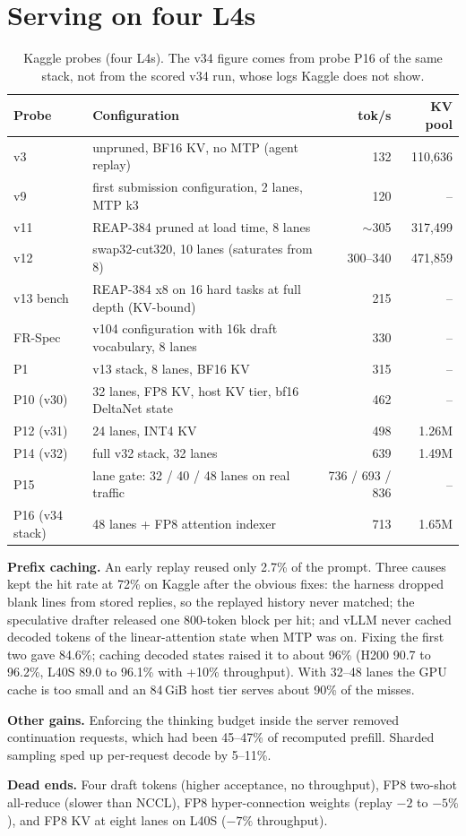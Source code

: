 \section{Serving on four L4s}\label{app:serving}

\begin{table}[H]\centering\small
\begin{tabularx}{\linewidth}{@{}lXrr@{}}
\toprule
Probe & Configuration & tok/s & KV pool \\
\midrule
v3 & unpruned, BF16 KV, no MTP (agent replay) & 132 & 110,636 \\
v9 & first submission configuration, 2 lanes, MTP k3 & 120 & -- \\
v11 & REAP-384 pruned at load time, 8 lanes & $\sim$305 & 317,499 \\
v12 & swap32-cut320, 10 lanes (saturates from 8) & 300--340 & 471,859 \\
v13 bench & REAP-384 x8 on 16 hard tasks at full depth (KV-bound) & 215 & -- \\
FR-Spec & v104 configuration with 16k draft vocabulary, 8 lanes & 330 & -- \\
P1 & v13 stack, 8 lanes, BF16 KV & 315 & -- \\
P10 (v30) & 32 lanes, FP8 KV, host KV tier, bf16 DeltaNet state & 462 & -- \\
P12 (v31) & 24 lanes, INT4 KV & 498 & 1.26M \\
P14 (v32) & full v32 stack, 32 lanes & 639 & 1.49M \\
P15 & lane gate: 32 / 40 / 48 lanes on real traffic & 736 / 693 / 836 & -- \\
P16 (v34 stack) & 48 lanes + FP8 attention indexer & 713 & 1.65M \\
\bottomrule
\end{tabularx}
\caption{Kaggle probes (four L4s). The v34 figure comes from probe P16 of the same stack, not from the scored v34 run, whose logs Kaggle does not show.}
\end{table}

\textbf{Prefix caching.} An early replay reused only 2.7\% of the prompt. Three causes kept the hit rate at 72\% on Kaggle after the obvious fixes: the harness dropped blank lines from stored replies, so the replayed history never matched; the speculative drafter released one 800-token block per hit; and vLLM never cached decoded tokens of the linear-attention state when MTP was on. Fixing the first two gave 84.6\%; caching decoded states raised it to about 96\% (H200 90.7 to 96.2\%, L40S 89.0 to 96.1\% with +10\% throughput). With 32--48 lanes the GPU cache is too small and an 84\,GiB host tier serves about 90\% of the misses.

\textbf{Other gains.} Enforcing the thinking budget inside the server removed continuation requests, which had been 45--47\% of recomputed prefill. Sharded sampling sped up per-request decode by 5--11\%.

\textbf{Dead ends.} Four draft tokens (higher acceptance, no throughput), FP8 two-shot all-reduce (slower than NCCL), FP8 hyper-connection weights (replay $-2$ to $-5\%$), and FP8 KV at eight lanes on L40S ($-7\%$ throughput).
